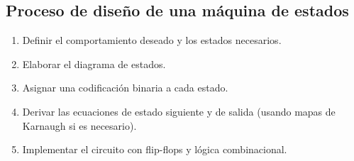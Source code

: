 \subsection{Proceso de diseño de una máquina de estados}

\begin{enumerate}
    \item Definir el comportamiento deseado y los estados necesarios.
    \item Elaborar el diagrama de estados.
    \item Asignar una codificación binaria a cada estado.
    \item Derivar las ecuaciones de estado siguiente y de salida (usando mapas de Karnaugh si es necesario).
    \item Implementar el circuito con flip-flops y lógica combinacional.
\end{enumerate}
